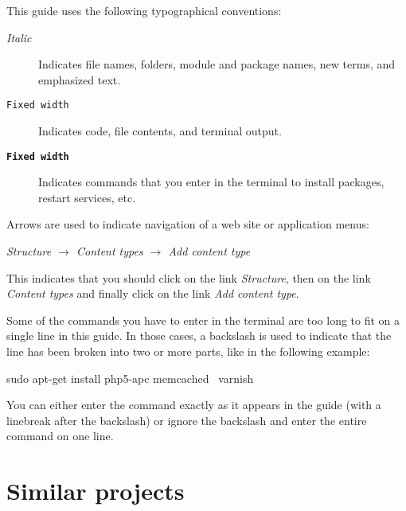 \documentclass[draft,ebook,10pt,twoside,openright]{memoir}
\begin{document}
This guide uses the following typographical conventions:

\begin{squashboxsnugshade}
\begin{description}
\item[\normalfont\emph{Italic}] Indicates file names, folders, module and package names, new terms, and emphasized text.
\item[\normalfont\texttt{Fixed width}] Indicates code, file contents, and terminal output.
\item[\normalfont\textbf{\texttt{Fixed width}}] Indicates commands that you enter in the terminal to install packages, restart services, etc.
\end{description}
\end{squashboxsnugshade}

Arrows are used to indicate navigation of a web site or application menus:

\begin{squashboxsnugshade}
\emph{Structure $\rightarrow$ Content types $\rightarrow$ Add content type}
\end{squashboxsnugshade}

This indicates that you should click on the link \emph{Structure}, then on the link \emph{Content types} and finally click on the link \emph{Add content type}.


\endgroup

Some of the commands you have to enter in the terminal are too long to fit on a single line in this guide. In those cases, a backslash is used to indicate that the line has been broken into two or more parts, like in the following example:

\begin{squashboxcommand}
sudo apt-get install php5-apc memcached \
  varnish
\end{squashboxcommand}

\noindent
You can either enter the command exactly as it appears in the guide (with a linebreak after the backslash) or ignore the backslash and enter the entire command on one line.

\section*{Similar projects}
\end{document}
